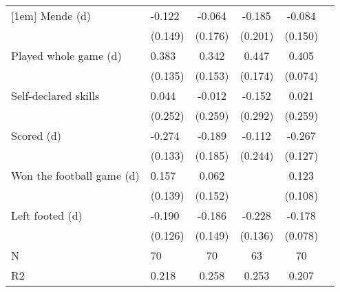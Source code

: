 {\begin{tabularx}{\textwidth}{Xl*{4}{c}}
[1em]
Mende (d)           &      -0.122         &      -0.064         &      -0.185         &      -0.084         \\
                    &     (0.149)         &     (0.176)         &     (0.201)         &     (0.150)         \\
[1em]
Played whole game (d)&       0.383\sym{***}&       0.342\sym{**} &       0.447\sym{**} &       0.405\sym{***}\\
                    &     (0.135)         &     (0.153)         &     (0.174)         &     (0.074)         \\
[1em]
Self-declared skills&       0.044         &      -0.012         &      -0.152         &       0.021         \\
                    &     (0.252)         &     (0.259)         &     (0.292)         &     (0.259)         \\
[1em]
Scored (d)          &      -0.274\sym{**} &      -0.189         &      -0.112         &      -0.267\sym{**} \\
                    &     (0.133)         &     (0.185)         &     (0.244)         &     (0.127)         \\
[1em]
Won the football game (d)&       0.157         &       0.062         &                     &       0.123         \\
                    &     (0.139)         &     (0.152)         &                     &     (0.108)         \\
[1em]
Left footed (d)     &      -0.190         &      -0.186         &      -0.228\sym{*}  &      -0.178\sym{**} \\
                    &     (0.126)         &     (0.149)         &     (0.136)         &     (0.078)         \\
\hline
N                   &          70         &          70         &          63         &          70         \\
R2                  &       0.218         &       0.258         &       0.253         &       0.207         \\
\hline\hline
\end{tabularx}
}
